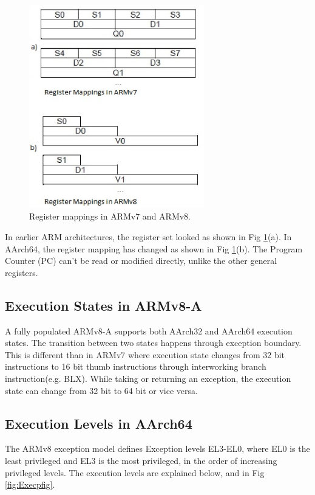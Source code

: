 \documentclass[journal]{IEEEtran}
\begin{document}
\begin{figure}[h]
	\centering
    \includegraphics[width=3.0in]{./figures/reg.eps}
    \caption{Register mappings in ARMv7 and ARMv8.}
    \label{fig:Regfig}
\end{figure}

In earlier ARM architectures, the register set looked as shown in Fig \ref{fig:Regfig}(a). In AArch64, the register mapping has changed as shown in Fig \ref{fig:Regfig}(b).
The Program Counter (PC) can't be read or modified directly, unlike the other general registers.

\subsection{Execution States in ARMv8-A}
A fully populated ARMv8-A supports both AArch32 and AArch64 execution states. The transition between two states happens through exception boundary.  This is different than in ARMv7 where execution state changes from 32 bit instructions to 16 bit thumb instructions through interworking branch instruction(e.g. BLX). While taking or returning an exception, the execution state can change from 32 bit to 64 bit or vice versa.

\subsection{Execution Levels in AArch64}
The ARMv8 exception model defines Exception levels EL3-EL0, where EL0 is the least privileged and EL3 is the most privileged, in the order of increasing privileged levels. The execution levels are explained below, and in Fig \ref{fig:Execpfig}.
\end{document}
